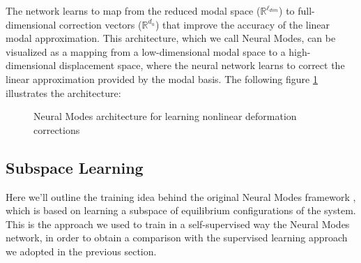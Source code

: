 The network learns to map from the reduced modal space (\( \mathbb{R}^{\ell_{dim}} \)) to full-dimensional correction vectors (\( \mathbb{R}^{d_u} \)) that improve the accuracy of the linear modal approximation. This architecture, which we call Neural Modes, can be visualized as a mapping from a low-dimensional modal space to a high-dimensional displacement space, where the neural network learns to correct the linear approximation provided by the modal basis. The following figure \ref{fig:neural_modes_arch} illustrates the architecture:
\begin{figure}[H]    \centering
    \caption{Neural Modes architecture for learning nonlinear deformation corrections}
    \label{fig:neural_modes_arch}
\end{figure}


\subsection{Subspace Learning}
Here we'll outline the training idea behind the original Neural Modes framework \cite{Wang_Du_Coros_Thomaszewski_2024}, which is based on learning a subspace of equilibrium configurations of the system. This is the approach we used to train in a self-supervised way the Neural Modes network, in order to obtain a comparison with the supervised learning approach we adopted in the previous section.


